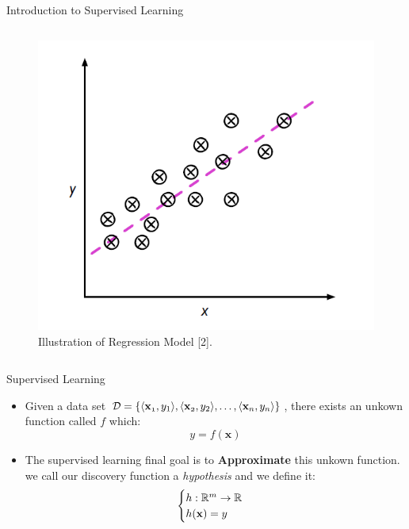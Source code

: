 \documentclass[compress,oilve]{beamer}
\begin{document}
\begin{frame}{Introduction to Supervised Learning}
\begin{columns}
\begin{column}{0.5\textwidth}
\begin{figure}
 \includegraphics[scale=0.5]{11}  
 \caption{Illustration of Regression Model [2].}
\end{figure}
\end{column}
\end{columns}
\end{frame}

\begin{frame}{Supervised Learning}
\begin{itemize}
\item Given a data set $ \mathcal{D} = \{ \langle \mathbf{x_{\mathnormal 1}} , y_{1} \rangle, \langle \mathbf{x_{\mathnormal 2}} , y_{2} \rangle, \dots, \langle \mathbf{x_{\mathnormal n}} , y_{n} \rangle\} $, there exists an unkown function called $ f $ which:
$$ y = f(\mathbf{x})$$
\item The supervised learning final goal is to \textbf{Approximate} this unkown function. we call our discovery function a \textit{hypothesis} and we define it:
$$  \begin{cases}
       h: \mathbb{R^{\mathnormal m}} \rightarrow \mathbb{R} \\
       h(\mathbf{x}) = y  
  \end{cases} $$
\end{itemize}
\end{frame}
\end{document}
